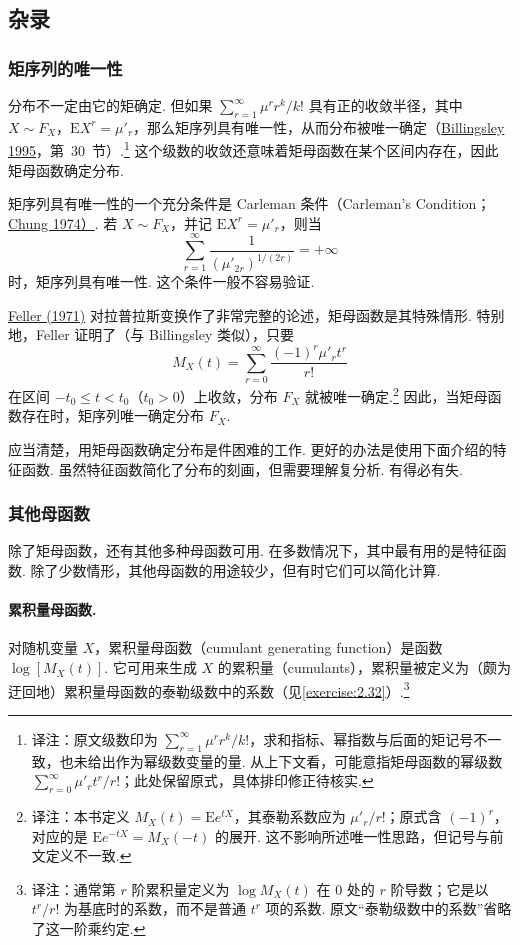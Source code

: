 \subsection{杂录}\label{sec:2.6}
\subsubsection{矩序列的唯一性}\label{sec:2.6.1}
分布不一定由它的矩确定. 但如果 $\sum_{r=1}^\infty\mu^r r^k/k!$ 具有正的收敛半径，其中 $X\sim F_X$，$\mathrm EX^r=\mu'_r$，那么矩序列具有唯一性，从而分布被唯一确定（\hyperref[bib:source33]{Billingsley 1995}，第~30~节）.\footnote{译注：原文级数印为 $\sum_{r=1}^\infty\mu^r r^k/k!$，求和指标、幂指数与后面的矩记号不一致，也未给出作为幂级数变量的量. 从上下文看，可能意指矩母函数的幂级数 $\sum_{r=0}^\infty\mu'_r t^r/r!$；此处保留原式，具体排印修正待核实.} 这个级数的收敛还意味着矩母函数在某个区间内存在，因此矩母函数确定分布.

矩序列具有唯一性的一个充分条件是 Carleman 条件（Carleman's Condition；\hyperref[bib:source78]{Chung 1974）}. 若 $X\sim F_X$，并记 $\mathrm EX^r=\mu'_r$，则当
$$\sum_{r=1}^\infty\frac1{(\mu'_{2r})^{1/(2r)}}=+\infty$$
时，矩序列具有唯一性. 这个条件一般不容易验证.

\hyperref[bib:source119]{Feller (1971)} 对拉普拉斯变换作了非常完整的论述，矩母函数是其特殊情形. 特别地，Feller 证明了（与 Billingsley 类似），只要
$$M_X(t)=\sum_{r=0}^\infty\frac{(-1)^r\mu'_r t^r}{r!}$$
在区间 $-t_0\le t<t_0$（$t_0>0$）上收敛，分布 $F_X$ 就被唯一确定.\footnote{译注：本书定义 $M_X(t)=\mathrm Ee^{tX}$，其泰勒系数应为 $\mu'_r/r!$；原式含 $(-1)^r$，对应的是 $\mathrm Ee^{-tX}=M_X(-t)$ 的展开. 这不影响所述唯一性思路，但记号与前文定义不一致.} 因此，当矩母函数存在时，矩序列唯一确定分布 $F_X$.

应当清楚，用矩母函数确定分布是件困难的工作. 更好的办法是使用下面介绍的特征函数. 虽然特征函数简化了分布的刻画，但需要理解复分析. 有得必有失.

\subsubsection{其他母函数}\label{sec:2.6.2}
除了矩母函数，还有其他多种母函数可用. 在多数情况下，其中最有用的是特征函数. 除了少数情形，其他母函数的用途较少，但有时它们可以简化计算.

\paragraph{累积量母函数.}
对随机变量 $X$，累积量母函数（cumulant generating function）是函数 $\log[M_X(t)]$. 它可用来生成 $X$ 的累积量（cumulants），累积量被定义为（颇为迂回地）累积量母函数的泰勒级数中的系数（见\autoref{exercise:2.32}）.\footnote{译注：通常第 $r$ 阶累积量定义为 $\log M_X(t)$ 在 $0$ 处的 $r$ 阶导数；它是以 $t^r/r!$ 为基底时的系数，而不是普通 $t^r$ 项的系数. 原文“泰勒级数中的系数”省略了这一阶乘约定.}

